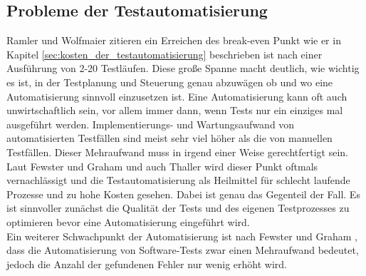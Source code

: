 \subsection{Probleme der Testautomatisierung}
\label{sec:probleme_der_testautomatisierung}
Ramler und Wolfmaier \cite{ramler_economic_2006} zitieren ein Erreichen des break-even Punkt wie er in Kapitel \ref{sec:kosten_der_testautomatisierung} beschrieben ist nach einer Ausführung von 2-20 Testläufen. Diese große Spanne macht deutlich, wie wichtig es ist, in der Testplanung und Steuerung genau abzuwägen ob und wo eine Automatisierung sinnvoll einzusetzen ist. Eine Automatisierung kann oft auch unwirtschaftlich sein, vor allem immer dann, wenn Tests nur ein einziges mal ausgeführt werden. Implementierungs- und Wartungsaufwand von automatisierten Testfällen sind meist sehr viel höher als die von manuellen Testfällen. Dieser Mehraufwand muss in irgend einer Weise gerechtfertigt sein. Laut Fewster und Graham \cite[vgl. S. 22 ff.]{fewster_software_1999} und auch Thaller \cite[vgl. S.230 ff.]{thaller_software-test_2002} wird dieser Punkt oftmals vernachlässigt und die Testautomatisierung als Heilmittel für schlecht laufende Prozesse und zu hohe Kosten gesehen. Dabei ist genau das Gegenteil der Fall. Es ist sinnvoller zunächst die Qualität der Tests und des eigenen Testprozesses zu optimieren bevor eine Automatisierung eingeführt wird.\\ 
Ein weiterer Schwachpunkt der Automatisierung ist nach Fewster und Graham \cite[vgl. S. 22 ff.]{fewster_software_1999}, dass die Automatisierung von Software-Tests zwar einen Mehraufwand bedeutet, jedoch die Anzahl der gefundenen Fehler nur wenig erhöht wird.
